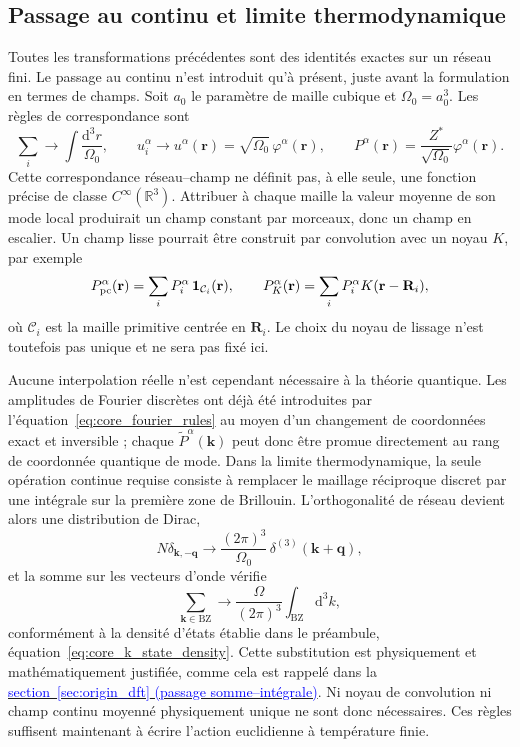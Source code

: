 \subsection{Passage au continu et limite thermodynamique}

Toutes les transformations précédentes sont des identités exactes sur un
réseau fini. Le passage au continu n'est introduit qu'à présent, juste avant la
formulation en termes de champs. Soit $a_0$ le paramètre de maille cubique et
$\Omega_0=a_0^3$. Les règles de correspondance sont
\begin{equation}
\sum_i\longrightarrow\int\frac{\mathrm d^3r}{\Omega_0},
\qquad
u_i^\alpha\longrightarrow u^\alpha(\mathbf r)
=\sqrt{\Omega_0}\,\varphi^\alpha(\mathbf r),
\qquad
P^\alpha(\mathbf r)=\frac{Z^*}{\sqrt{\Omega_0}}\varphi^\alpha(\mathbf r).
\label{eq:core_mapping_rules}
\end{equation}
Cette correspondance réseau--champ ne définit pas, à elle seule, une fonction
précise de classe $C^\infty(\mathbb R^3)$. Attribuer à chaque maille la valeur
moyenne de son mode local produirait un champ constant par morceaux, donc un
champ en escalier. Un champ lisse pourrait être construit par convolution avec
un noyau $K$, par exemple
\[
P_{\rm pc}^\alpha(\mathbf r)
=\sum_iP_i^\alpha\,\mathbf 1_{\mathcal C_i}(\mathbf r),
\qquad
P_K^\alpha(\mathbf r)
=\sum_iP_i^\alpha K(\mathbf r-\mathbf R_i),
\]
où $\mathcal C_i$ est la maille primitive centrée en $\mathbf R_i$. Le choix
du noyau de lissage n'est toutefois pas unique et ne sera pas fixé ici.

Aucune interpolation réelle n'est cependant nécessaire à la théorie
quantique. Les amplitudes de Fourier discrètes ont déjà été introduites par
l'équation~\eqref{eq:core_fourier_rules} au moyen d'un changement de
coordonnées exact et inversible ; chaque $\widetilde P^\alpha(\mathbf k)$ peut
donc être promue directement au rang de coordonnée quantique de mode. Dans la
limite thermodynamique, la seule opération continue requise consiste à
remplacer le maillage réciproque discret par une intégrale sur la première zone
de Brillouin. L'orthogonalité de réseau devient alors une distribution de
Dirac,
\begin{equation}
N\delta_{\mathbf k,-\mathbf q}
\longrightarrow
\frac{(2\pi)^3}{\Omega_0}\,
\delta^{(3)}(\mathbf k+\mathbf q),
\label{eq:core_continuum_orthogonality}
\end{equation}
et la somme sur les vecteurs d'onde vérifie
\begin{equation}
\sum_{\mathbf k\in\mathrm{BZ}}
\longrightarrow
\frac{\Omega}{(2\pi)^3}\int_{\mathrm{BZ}}\mathrm d^3k,
\label{eq:core_sum_to_integral_rule}
\end{equation}
conformément à la densité d'états établie dans le préambule,
équation~\eqref{eq:core_k_state_density}. Cette substitution est physiquement
et mathématiquement justifiée, comme cela est rappelé dans la
\hyperref[par:core_sum_to_integral]{\textcolor{blue}{section~\ref*{sec:origin_dft}
(passage somme--intégrale)}}. Ni noyau de
convolution ni champ continu moyenné physiquement unique ne sont donc
nécessaires. Ces règles suffisent maintenant à écrire l'action euclidienne à
température finie.

